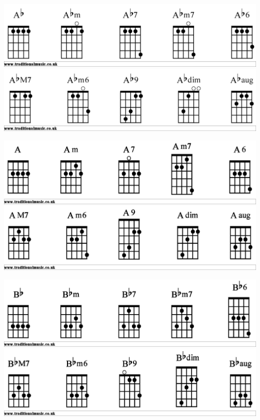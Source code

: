 

\includegraphics[scale=.15]{chords/Abbjo1}
\includegraphics[scale=.15]{chords/Abbjo2}

\includegraphics[scale=.15]{chords/Abjo1}
\includegraphics[scale=.15]{chords/Abjo2}

\includegraphics[scale=.15]{chords/Bbbjo1}
\includegraphics[scale=.15]{chords/Bbbjo2}

